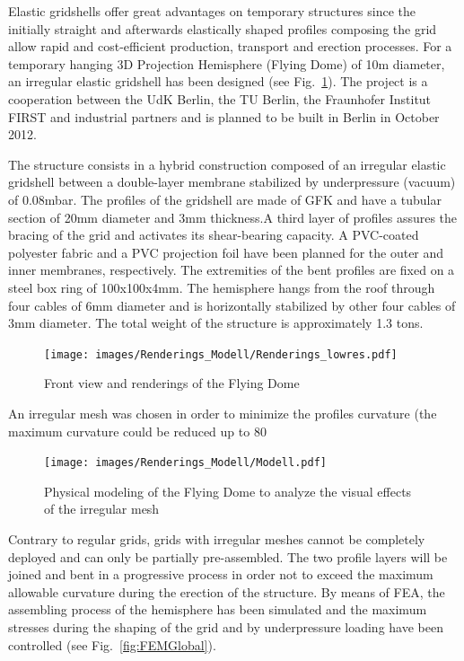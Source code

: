 \documentclass[Thesis.tex]{subfiles}
\begin{document}
Elastic gridshells offer great advantages on temporary structures since the initially straight and afterwards elastically shaped profiles composing the grid allow rapid and cost-efficient production, transport and erection processes. For a temporary hanging 3D Projection Hemisphere (Flying Dome) of 10m diameter, an irregular elastic gridshell has been designed (see Fig.~\ref{fig:Renderings}). The project is a cooperation between the UdK Berlin, the TU Berlin, the Fraunhofer Institut FIRST and industrial partners and is planned to be built in Berlin in October 2012.

The structure consists in a hybrid construction composed of an irregular elastic gridshell between a double-layer membrane stabilized by underpressure (vacuum) of 0.08mbar. The profiles of the gridshell are made of GFK and have a tubular section of 20mm diameter and 3mm thickness.A third layer of profiles assures the bracing of the grid and activates its shear-bearing capacity. A PVC-coated polyester fabric and a PVC projection foil have been planned for the outer and inner membranes, respectively. The extremities of the bent profiles are fixed on a steel box ring of 100x100x4mm. The hemisphere hangs from the roof through four cables of 6mm diameter and is horizontally stabilized by other four cables of 3mm diameter. The total weight of the structure is approximately 1.3 tons.

\begin{figure}
\centering
\texttt{[image: images/Renderings\_Modell/Renderings\_lowres.pdf]}
\caption{Front view and renderings of the Flying Dome}
\label{fig:Renderings}
\end{figure}

An irregular mesh was chosen in order to minimize the profiles curvature (the maximum curvature could be reduced up to 80%

\begin{figure}
\centering
\texttt{[image: images/Renderings\_Modell/Modell.pdf]}
\caption{Physical modeling of the Flying Dome to analyze the visual effects of the irregular mesh}
\label{fig:Modell}
\end{figure}

Contrary to regular grids, grids with irregular meshes cannot be completely deployed and can only be partially pre-assembled. The two profile layers will be joined and bent in a progressive process in order not to exceed the maximum allowable curvature during the erection of the structure. By means of FEA, the assembling process of the hemisphere has been simulated and the maximum stresses during the shaping of the grid and by underpressure loading have been controlled (see Fig.~\ref{fig:FEMGlobal}). 
\end{document}
